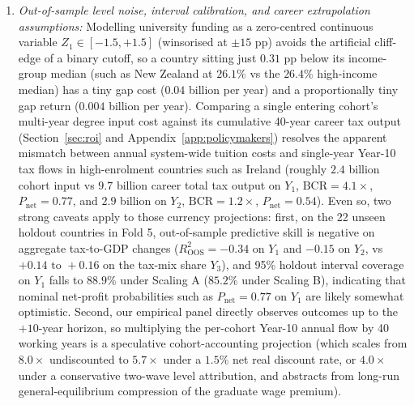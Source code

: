 \documentclass[11pt,a4paper]{article}
\begin{document}
\begin{enumerate}
  \item \emph{Out-of-sample level noise, interval calibration, and career extrapolation assumptions:} Modelling university funding as a zero-centred continuous variable $Z_1 \in [-1.5, +1.5]$ (winsorised at $\pm 15$ pp) avoids the artificial cliff-edge of a binary cutoff, so a country sitting just $0.31$ pp below its income-group median (such as New Zealand at $26.1\%$ vs the $26.4\%$ high-income median) has a tiny gap cost (\texteuro$0.04$ billion per year) and a proportionally tiny gap return (\texteuro$0.004$ billion per year). Comparing a single entering cohort's multi-year degree input cost against its cumulative 40-year career tax output (Section~\ref{sec:roi} and Appendix~\ref{app:policymakers}) resolves the apparent mismatch between annual system-wide tuition costs and single-year Year-10 tax flows in high-enrolment countries such as Ireland (roughly \texteuro$2.4$ billion cohort input vs \texteuro$9.7$ billion career total tax output on $Y_1$, $\text{BCR} = 4.1\times$, $P_{\text{net}} = 0.77$, and \texteuro$2.9$ billion on $Y_2$, $\text{BCR} = 1.2\times$, $P_{\text{net}} = 0.54$). Even so, two strong caveats apply to those currency projections: first, on the 22 unseen holdout countries in Fold 5, out-of-sample predictive skill is negative on aggregate tax-to-GDP changes ($R^2_{\text{OOS}} = -0.34$ on $Y_1$ and $-0.15$ on $Y_2$, vs $+0.14\text{ to }+0.16$ on the tax-mix share $Y_3$), and 95\% holdout interval coverage on $Y_1$ falls to $88.9\%$ under Scaling A ($85.2\%$ under Scaling B), indicating that nominal net-profit probabilities such as $P_{\text{net}} = 0.77$ on $Y_1$ are likely somewhat optimistic. Second, our empirical panel directly observes outcomes up to the $+10$-year horizon, so multiplying the per-cohort Year-10 annual flow by 40 working years is a speculative cohort-accounting projection (which scales from $8.0\times$ undiscounted to $5.7\times$ under a $1.5\%$ net real discount rate, or $4.0\times$ under a conservative two-wave level attribution, and abstracts from long-run general-equilibrium compression of the graduate wage premium).
\end{enumerate}
\end{document}
